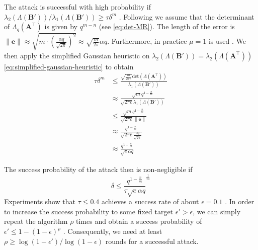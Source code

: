 The attack is successful with high probability if $\lambda_2(\Lambda(\mathbf{B}'))/\lambda_1(\Lambda(\mathbf{B}')) \geq \tau \delta^m$ \cite{AFG13}. Following \cite{Gop16} we assume that the determinant of $\Lambda_q(\mathbf{A}^\intercal)$ is given by $q^{m-n}$ (see \cref{eq:det-MR}). The length of the error is $\|\mathbf{e}\| \approx \sqrt{m\cdot \left(\frac{\alpha q}{\sqrt{2\pi}}\right)^2} \approx \sqrt{\frac{m}{2\pi}} \alpha q$. Furthermore, in practice $\mu=1$ is used \cite{APS15}. We then apply the simplified Gaussian heuristic on $\lambda_2(\Lambda(\mathbf{B}'))=\lambda_2(\Lambda(\mathbf{A}^\intercal))$ \cref{eq:simplified-gaussian-heuristic} to obtain
\begin{align}
  \tau \delta^m & \leq \frac{ \sqrt{\frac{m}{2\pi e}} \text{det}(\Lambda(\mathbf{A}^\intercal))}{\lambda_1(\Lambda(\mathbf{B}'))} \\
                & \approx \frac{\sqrt{m} q^{1-\frac{n}{m}}}{\sqrt{2\pi e} \lambda_1(\Lambda(\mathbf{B}'))}                        \\
                & \leq \frac{\sqrt{m} q^{1-\frac{n}{m}}}{\sqrt{2\pi e} \|\mathbf{e}\|}                                            \\
                & \approx \frac{q^{1-\frac{n}{m}}}{\sqrt{2\pi e}  \frac{\alpha q}{\sqrt{2\pi}}}                                   \\
                & \approx \frac{q^{1-\frac{n}{m}}}{\sqrt{e} \alpha q}
\end{align}

The success probability of the attack then is non-negligible if
\begin{equation}
  \delta \leq \frac{q^{1-\frac{n}{m}}}{\tau \sqrt{e} \alpha q}^{\frac{1}{m}}
\end{equation}
Experiments show that $\tau \leq 0.4$ achieves a success rate of about $\epsilon = 0.1$ \cite{AFG13}. In order to increase the success probability to some fixed target $\epsilon' > \epsilon$, we can simply repeat the algorithm $\rho$ times and obtain a success probability of $\epsilon' \leq 1 - (1 - \epsilon)^\rho$ \cite{BBGS19}. Consequently, we need at least $\rho \geq \log(1-\epsilon')/\log(1-\epsilon)$ rounds for a successful attack.



